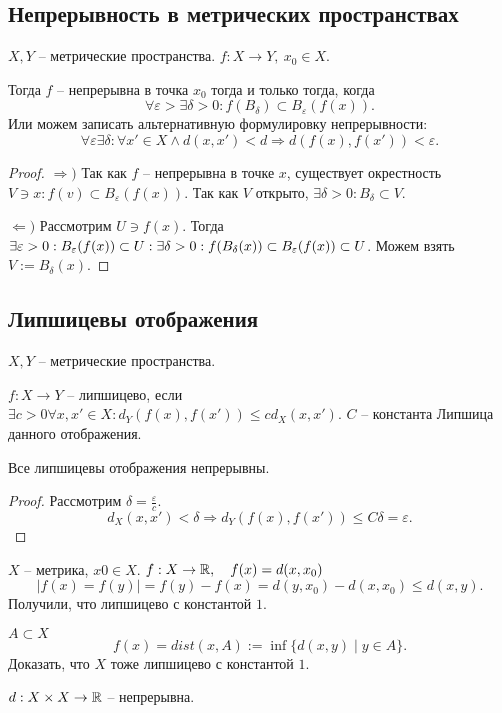 \documentclass[12pt]{report}
\begin{document}
\subsection{Непрерывность в метрических пространствах}
\begin{thm}
    $X, Y$ -- метрические пространства.  $f: X \to  Y, ~ x_0 \in  X$.

    Тогда $f$ -- непрерывна в точка $x_0$ тогда и только тогда, когда 
    \[
	\forall  \varepsilon > \exists  \delta  >0: f(B_{ \delta }) \subset B_{ \varepsilon } (f(x))
    .\] 
    Или можем записать альтернативную формулировку непрерывности:
    \[
	\forall  \varepsilon  \exists \delta : \forall x' \in  X \wedge d(x, x') < d \Rightarrow  d(f(x) , f(x')) < \varepsilon 
    .\] 
\end{thm}
\begin{proof}
    $ \Rightarrow )$ Так как $f$ -- непрерывна в точке $x$, существует окрестность $V \ni x: f(v) \subset  B_{ \varepsilon }(f(x))$. Так как $V$ открыто, $\exists  \delta >0 : B_{ \delta } \subset  V$.

    $ \Leftarrow )$ Рассмотрим $U \ni f(x)$.
    Тогда $\exists  \varepsilon >0: B_{ \varepsilon }(f(x)) \subset U: \\
    \exists \delta  >0 : f(B_{\delta}(x)) \subset  B_{ \varepsilon } (f(x)) \subset  U$.
    Можем взять  $V:=B_{ \delta } (x)$.
\end{proof}
\subsection{Липшицевы отображения}
\begin{defn}
    $X, Y$ -- метрические пространства.

    $f: X \to  Y$ -- липшицево, если $\exists c > 0 \forall  x, x' \in  X: d_Y(f(x), f(x')) \le c d_X(x, x')$. $C$ -- константа Липшица данного отображения.
\end{defn}
\begin{cor}
    Все липшицевы отображения непрерывны.
\end{cor}
\begin{proof}
    Рассмотрим $ \delta = \frac{\varepsilon}{c}$. 
    \[
	d_X(x, x') < \delta  \Rightarrow d_Y(f(x), f(x')) \le C \delta = \varepsilon 
    .\] 
\end{proof}
\begin{ex}
    $X $ -- метрика, $x0 \in  X$.
    $f: X \to  \mathbb{R}, \quad f(x) = d(x, x_0)$
    \[
	|f(x) = f(y)| = f(y) - f(x) = d(y, x_0) - d(x, x_0) \le d(x, y)
    .\] 
    Получили, что липшицево с константой $1$.
\end{ex}
\begin{task}
    $A \subset  X$ 
    \[
	f(x) = dist(x, A) := \inf \{d(x, y) \mid y \in  A\}
    .\] 
    Доказать, что $X$ тоже липшицево с константой $1$.
\end{task}
\begin{ex}
    $d : X \times X \to  \mathbb{R}$ -- непрерывна.
\end{ex}
\end{document}
